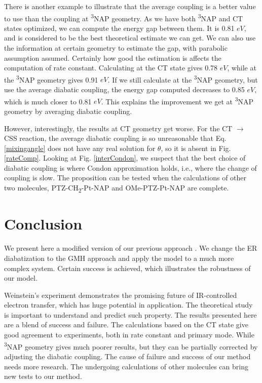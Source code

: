 There is another example to illustrate that the average coupling is a better value to use than the coupling at \textsuperscript{3}NAP geometry. As we have both \textsuperscript{3}NAP and CT states optimized, we can compute the energy gap between them. It is 0.81 $eV$, and is considered to be the best theoretical estimate we can get. We can also use the information at certain geometry to estimate the gap, with parabolic assumption assumed. Certainly how good the estimation is affects the computation of rate constant. Calculating at the CT state gives 0.78 $eV$, while at the \textsuperscript{3}NAP geometry gives 0.91 $eV$. If we still calculate at the \textsuperscript{3}NAP geometry, but use the average diabatic coupling, the energy gap computed decreases to 0.85 $eV$, which is much closer to 0.81 $eV$. This explains the improvement we get at \textsuperscript{3}NAP geometry by averaging diabatic coupling.

However, interestingly, the results at CT geometry get worse. For the CT $\rightarrow$  CSS reaction, the average diabatic coupling is so unreasonable that Eq. \ref{mixingangle} does not have any real solution for $\theta$, so it is absent in Fig. \ref{rateComp}. Looking at Fig. \ref{interCondon}, we suspect that the best choice of diabatic coupling is where Condon approximation holds, i.e., where the change of coupling is slow. The proposition can be tested when the calculations of other two molecules, PTZ-CH\textsubscript{2}-Pt-NAP and OMe-PTZ-Pt-NAP are complete.


\section{Conclusion} %
We present here a modified version of our previous approach \cite{yang2014intramolecular,yang2015computing}. We change the ER diabatization to the GMH approach and apply the model to a much more complex system. Certain success is achieved, which illustrates the robustness of our model.

Weinstein's experiment demonstrates the promising future of IR-controlled electron transfer, which has huge potential in application. The theoretical study is important to understand and predict such property. The results presented here are a blend of success and failure. The calculations based on the CT state give good agreement to experiments, both in rate constant and primary mode. While \textsuperscript{3}NAP geometry gives much poorer results, but they can be partially corrected by adjusting the diabatic coupling. The cause of failure and success of our method needs more research. The undergoing calculations of other molecules can bring new tests to our method.



